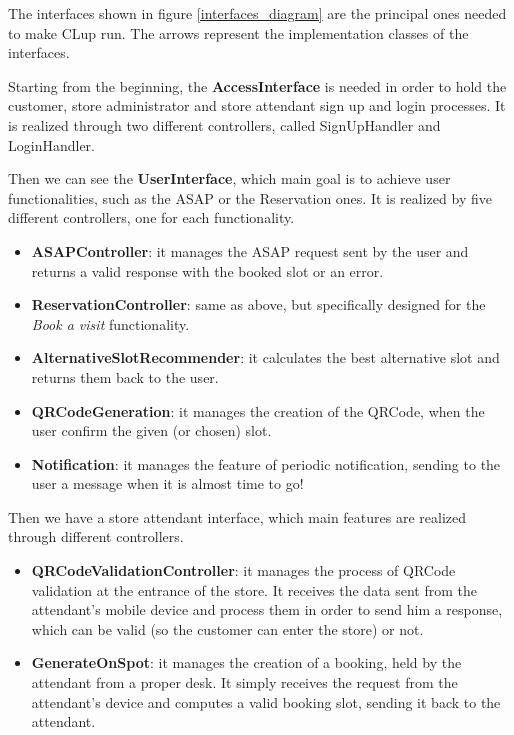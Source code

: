 \documentclass[table, 12pt]{article}
\begin{document}
The interfaces shown in figure \ref{interfaces_diagram} are the principal ones needed to make CLup run. The arrows represent the implementation classes of the interfaces.

Starting from the beginning, the \textbf{AccessInterface} is needed in order to hold the customer, store administrator and store attendant sign up and login processes. It is realized through two different controllers, called SignUpHandler and LoginHandler.

Then we can see the \textbf{UserInterface}, which main goal is to achieve user functionalities, such as the ASAP or the Reservation ones. It is realized by five different controllers, one for each functionality.
\begin{itemize}
    \item \textbf{ASAPController}: it manages the ASAP request sent by the user and returns a valid response with the booked slot or an error.
    \item \textbf{ReservationController}: same as above, but specifically designed for the \textit{Book a visit} functionality.
    \item \textbf{AlternativeSlotRecommender}: it calculates the best alternative slot and returns them back to the user.
    \item \textbf{QRCodeGeneration}: it manages the creation of the QRCode, when the user confirm the given (or chosen) slot.
    \item \textbf{Notification}: it manages the feature of periodic notification, sending to the user a message when it is almost time to go!
\end{itemize}

Then we have a store attendant interface, which main features are realized through different controllers.
\begin{itemize}
    \item \textbf{QRCodeValidationController}: it manages the process of QRCode validation at the entrance of the store. It receives the data sent from the attendant's mobile device and process them in order to send him a response, which can be valid (so the customer can enter the store) or not.
    \item \textbf{GenerateOnSpot}: it manages the creation of a booking, held by the attendant from a proper desk. It simply receives the request from the attendant's device and computes a valid booking slot, sending it back to the attendant.
\end{itemize}
\end{document}
